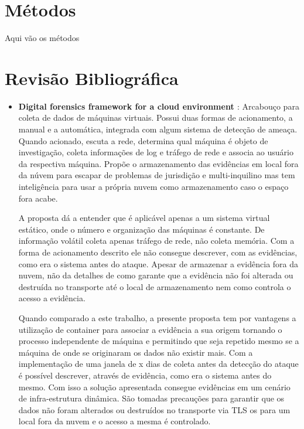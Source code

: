 \documentclass[
	12pt,				%
	openright,			%
	oneside,			%
	a4paper,			%
	english,			%
	french,				%
	spanish,			%
	brazil,				%
	]{abntex2}
\begin{document}
\chapter{Métodos}

Aqui vão os métodos

\chapter{Revisão Bibliográfica}

\begin{itemize}

\item \textbf{Digital forensics framework for a cloud environment \cite{George2012} }: Arcabouço para coleta de dados de máquinas virtuais. Possui duas formas de 
acionamento, a manual e a automática, integrada com algum sistema de detecção de ameaça. Quando acionado, escuta a rede, determina qual máquina é objeto de investigação, 
coleta informações de log e tráfego de rede e associa ao usuário da respectiva máquina. Propõe o armazenamento das evidências em local fora da núvem para escapar de 
problemas de jurisdição e multi-inquilino mas tem inteligência para usar a própria nuvem como armazenamento caso o espaço fora acabe.

A proposta dá a entender que é aplicável apenas a um sistema virtual estático, onde o número e organização das máquinas é constante. De informação volátil coleta apenas 
tráfego de rede, não coleta memória. Com a forma de acionamento descrito ele não consegue descrever, com as evidências, como era o sistema antes do ataque. Apesar de armazenar 
a evidência fora da nuvem, não da detalhes de como garante que a evidência não foi alterada ou destruída no transporte até o local de armazenamento nem como controla o 
acesso a evidência.

Quando comparado a este trabalho, a presente proposta tem por vantagens a utilização de container para associar a evidência a sua origem tornando o processo independente 
de máquina e permitindo que seja repetido mesmo se a máquina de onde se originaram os dados não existir mais. Com a implementação de uma janela de x dias de coleta antes da
detecção do ataque é possível descrever, através de evidência, como era o sistema antes do mesmo. Com isso a solução apresentada consegue evidências em um cenário de
infra-estrutura dinâmica. São tomadas precauções para garantir que os dados não foram alterados ou destruídos no transporte via TLS os para um local fora da nuvem e 
o acesso a mesma é controlado.\\
 

\end{itemize}
\end{document}
